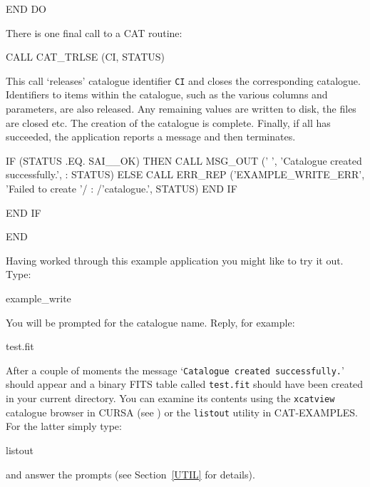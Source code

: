 \documentclass[11pt,twoside]{starlink}
\begin{document}
\begin{terminalv}
         END DO
\end{terminalv}

There is one final call to a CAT routine:

\begin{terminalv}
         CALL CAT_TRLSE (CI, STATUS)
\end{terminalv}

This call `releases' catalogue identifier \texttt{CI} and closes the
corresponding catalogue. Identifiers to items within the catalogue, such
as the various columns and parameters, are also released. Any remaining
values are written to disk, the files are closed etc. The creation of
the catalogue is complete. Finally, if all has succeeded, the
application reports a message and then terminates.

\begin{terminalv}
         IF (STATUS .EQ. SAI__OK) THEN
            CALL MSG_OUT (' ', 'Catalogue created successfully.',
     :        STATUS)
         ELSE
            CALL ERR_REP ('EXAMPLE_WRITE_ERR', 'Failed to create '/
     :        /'catalogue.', STATUS)
         END IF

      END IF

      END
\end{terminalv}

Having worked through this example application you might like to try
it out. Type:

\begin{terminalv}
example_write
\end{terminalv}

You will be prompted for the catalogue name. Reply, for example:

\begin{terminalv}
test.fit
\end{terminalv}

After a couple of moments the message `\texttt{Catalogue created
successfully.}' should appear and a binary FITS table called \texttt{test.fit} should have been created in your current directory. You can
examine its contents using the \texttt{xcatview} catalogue browser in
CURSA (see \cite{SUN190}) or the \texttt{listout}
utility in CAT-EXAMPLES.  For the latter simply type:

\begin{terminalv}
listout
\end{terminalv}

and answer the prompts (see Section~\ref{UTIL} for details).
\end{document}
